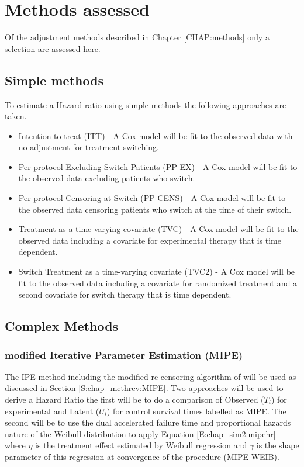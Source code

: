 \section{Methods assessed}
\label{S:chap_sim2:methass}
Of the adjustment methods described in Chapter \ref{CHAP:methods} only a selection are assessed here. 
\subsection{Simple methods}
To estimate a Hazard ratio using simple methods the following approaches are taken.
\begin{itemize}
\item Intention-to-treat (ITT) - A Cox model will be fit to the observed data with no adjustment for treatment switching. 
\item Per-protocol Excluding Switch Patients (PP-EX) - A Cox model will be fit to the observed data excluding patients who switch.
\item Per-protocol Censoring at Switch (PP-CENS) - A Cox model will be fit to the observed data censoring patients who switch at the time of their switch.
\item Treatment as a time-varying covariate (TVC) - A Cox model will be fit to the observed data including a covariate for experimental therapy that is time dependent.
\item Switch Treatment as a time-varying covariate (TVC2) - A Cox model will be fit to the observed data including
a covariate for randomized treatment and a second covariate for switch therapy that is time dependent.
\end{itemize}
\subsection{Complex Methods}
\subsubsection{modified Iterative Parameter Estimation (MIPE)}
The IPE method including the modified re-censoring algorithm of \cite{Zhang2016} will be used as discussed in Section \ref{S:chap_methrev:MIPE}. Two approaches will be used to derive a Hazard Ratio the first will be to do a comparison of Observed ($T_i$) for experimental and Latent ($U_i$) for control survival times labelled as MIPE. The second will be to use the dual accelerated failure time and proportional hazards nature of the Weibull distribution to apply Equation \ref{E:chap_sim2:mipehr} where $\eta$ is the treatment effect estimated by Weibull regression and $\gamma$ is the shape parameter of this regression at convergence of the procedure (MIPE-WEIB). 

